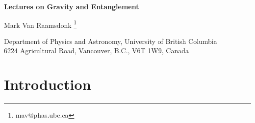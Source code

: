 \documentclass[12pt,epsf]{article}
\begin{document}
\begin{titlepage}
\hfill
\vbox{
    \halign{#\hfil         \cr
           } %
      }  %
\vspace*{20mm}
\begin{center}
{\Large \bf Lectures on Gravity and Entanglement}

\vspace*{15mm}
\vspace*{1mm}
Mark Van Raamsdonk
\vspace*{1cm}
\let\thefootnote\relax\footnote{mav@phas.ubc.ca}

{Department of Physics and Astronomy,
University of British Columbia\\
6224 Agricultural Road,
Vancouver, B.C., V6T 1W9, Canada\\
\vspace*{0.2cm}}

\vspace*{1cm}
\end{center}
\begin{abstract}
The AdS/CFT correspondence provides quantum theories of gravity in which spacetime and gravitational physics emerge from ordinary non-gravitational quantum systems with many degrees of freedom. Recent work in this context has uncovered fascinating connections between quantum information theory and quantum gravity, suggesting that spacetime geometry is directly related to the entanglement structure of the underlying quantum mechanical degrees of freedom and that aspects of spacetime dynamics (gravitation) can be understood from basic quantum information theoretic constraints. In these notes, we provide an elementary introduction to these developments, suitable for readers with some background in general relativity and quantum field theory. The notes are based on lectures given at the CERN Spring School 2014, the Jerusalem Winter School 2014, the TASI Summer School 2015, and the Trieste Spring School 2015.
\end{abstract}

\end{titlepage}

\vskip 1cm

\section{Introduction}
\end{document}
